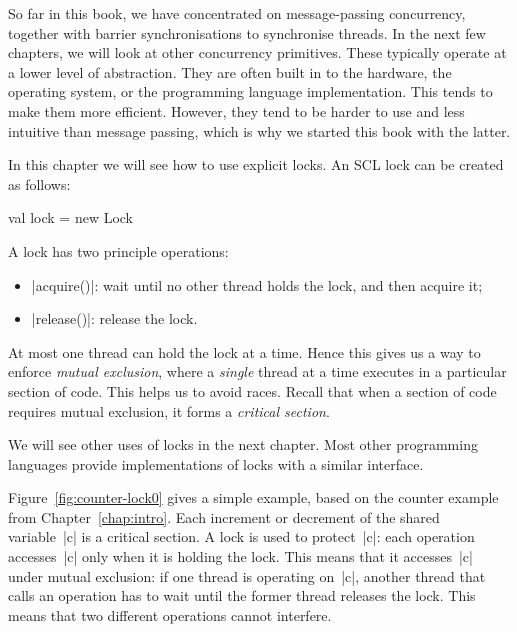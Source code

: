 So far in this book, we have concentrated on message-passing concurrency,
together with barrier synchronisations to synchronise threads.  In the next
few chapters, we will look at other concurrency primitives.  These typically
operate at a lower level of abstraction.  They are often built in to the
hardware, the operating system, or the programming language implementation.
This tends to make them more efficient.  However, they tend to be harder to
use and less intuitive than message passing, which is why we started this
book with the latter.

In this chapter we will see how to use explicit locks.  An SCL
lock can be created as follows:
%
\begin{scala}
  val lock = new Lock
\end{scala}

A lock has two principle operations:
%
\begin{itemize}
\item |acquire()|: wait until no other thread holds the
  lock, and then acquire it;

\item |release()|: release the lock.
\end{itemize}
%
At most one thread can hold the lock at a time.  Hence this gives us a way to
enforce \emph{mutual exclusion}, where a \emph{single}
thread at a time executes in a particular section of code.  This helps us to
avoid races.  Recall that when a section of code requires mutual exclusion, it
forms a \emph{critical section}.

We will see other uses of locks in the next chapter. 
%
Most other programming languages provide implementations of locks with a
similar interface.

Figure~\ref{fig:counter-lock0} gives a simple example, based on the counter
example from Chapter~\ref{chap:intro}.  Each increment or decrement of the
shared variable~|c| is a critical section.  A lock is used to protect~|c|:
each operation accesses~|c| only when it is holding the lock.  This means that
it accesses~|c| under mutual exclusion: if one thread is operating on~|c|,
another thread that calls an operation has to wait until the former thread
releases the lock.  This means that two different operations cannot interfere.


